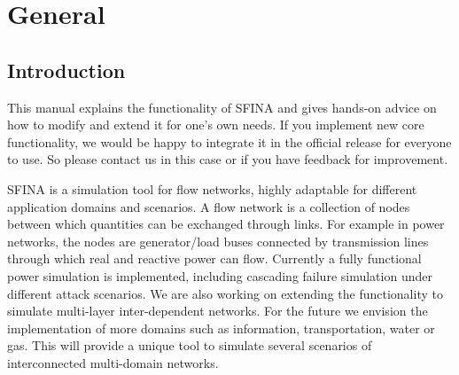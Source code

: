 \documentclass[11pt,fleqn]{book} %
\newcommand{\domain}[1][]{domain#1}
\begin{document}


\pagestyle{empty} %

\tableofcontents %

\listoftodos

\clearpage %

\pagestyle{fancy} %


\part{General}



\chapter{Introduction}
\label{ch:introduction}
This manual explains the functionality of SFINA and gives hands-on advice on how to modify and extend it for one's own needs. If you implement new core functionality, we would be happy to integrate it in the official release for everyone to use. So please contact us in this case or if you have feedback for improvement.

SFINA is a simulation tool for flow networks, highly adaptable for different application \domain{s} and scenarios. A flow network is a collection of nodes between which quantities can be exchanged through links. For example in power networks, the nodes are generator/load buses connected by transmission lines through which real and reactive power can flow. Currently a fully functional power simulation is implemented, including cascading failure simulation under different attack scenarios. We are also working on extending the functionality to simulate multi-layer inter-dependent networks. For the future we envision the implementation of more \domain{s} such as information, transportation, water or gas. This will provide a unique tool to simulate several scenarios of interconnected multi-\domain{} networks.
\end{document}
